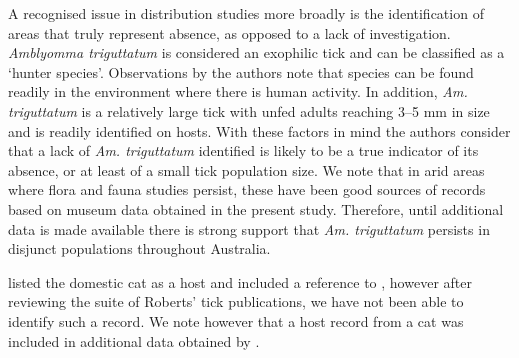 \documentclass[a4paper, nobind]{templates/ociamthesis}
\begin{document}
A recognised issue in distribution studies more broadly is the identification of areas that truly represent absence, as opposed to a lack of investigation.
\emph{Amblyomma triguttatum} is considered an exophilic tick and can be classified as a `hunter species'.
Observations by the authors note that species can be found readily in the environment where there is human activity.
In addition, \emph{Am. triguttatum} is a relatively large tick with unfed adults reaching 3--5 mm in size \autocite{robertsStatusMorphologicallyDivergent1962} and is readily identified on hosts.
With these factors in mind the authors consider that a lack of \emph{Am. triguttatum} identified is likely to be a true indicator of its absence, or at least of a small tick population size.
We note that in arid areas where flora and fauna studies persist, these have been good sources of records based on museum data obtained in the present study.
Therefore, until additional data is made available there is strong support that \emph{Am. triguttatum} persists in disjunct populations throughout Australia.

\textcite{waudbyHostsExoticOrnate2007} listed the domestic cat as a host and included a reference to \textcite{robertsAustralianTicks1970}, however after reviewing the suite of Roberts' tick publications, we have not been able to identify such a record.
We note however that a host record from a cat was included in additional data obtained by \textcite{waudbyHostsExoticOrnate2007}.

\clearpage

\begingroup\fontsize{8.5}{10.5}\selectfont
\end{document}
